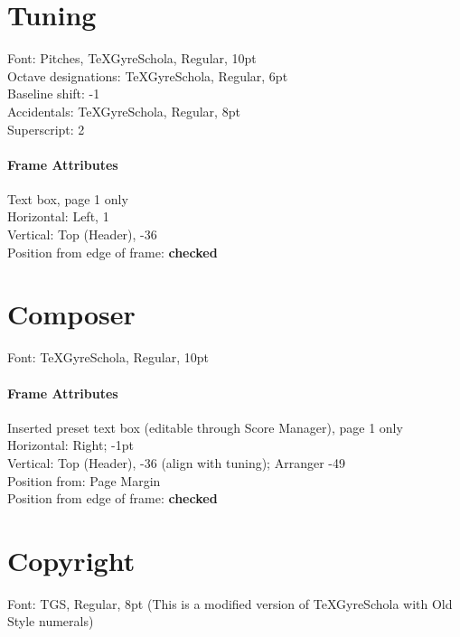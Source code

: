 \documentclass[unicode,hyperfootnotes=false,xetex,colorlinks=true,nofonts,nobib]{tufte-book} %
\begin{document}
\section{Tuning}
\label{sec:tuning}

Font: Pitches, TeXGyreSchola, Regular, 10pt\\
\indent Octave designations: TeXGyreSchola, Regular, 6pt\\
\indent Baseline shift: -1\\
Accidentals: TeXGyreSchola, Regular, 8pt\\
\indent Superscript: 2

\paragraph{Frame Attributes}
\label{sec:frame-attributes-1}

Text box, page 1 only\\
Horizontal: Left, 1\\
Vertical: Top (Header), -36\\
Position from edge of frame: \textbf{checked}

\section{Composer}
\label{sec:composer}

Font: TeXGyreSchola, Regular, 10pt\\

\paragraph{Frame Attributes}
\label{sec:frame-attributes-2}

Inserted preset text box (editable through Score Manager), page 1 only\\
Horizontal: Right; -1pt\\
Vertical: Top (Header), -36 (align with tuning); Arranger -49\\
Position from: Page Margin\\
Position from edge of frame: \textbf{checked}\\

\section{Copyright}
\label{sec:copyright}

Font: TGS, Regular, 8pt (This is a modified version of TeXGyreSchola with Old Style numerals)
\end{document}

